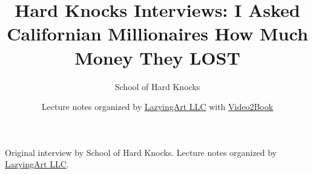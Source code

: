 \documentclass[11pt,oneside]{book}
\begin{document}
\frontmatter
\title{Hard Knocks Interviews: I Asked Californian Millionaires How Much Money They LOST}
\author{School of Hard Knocks}
\date{Lecture notes organized by \href{https://lazying.art}{LazyingArt LLC} with \href{https://github.com/lachlanchen/Video2Book}{Video2Book}}
\maketitle
\begin{center}
\small Original interview by School of Hard Knocks. Lecture notes organized by \href{https://lazying.art}{LazyingArt LLC}.
\end{center}
\clearpage
\mainmatter

\end{document}
